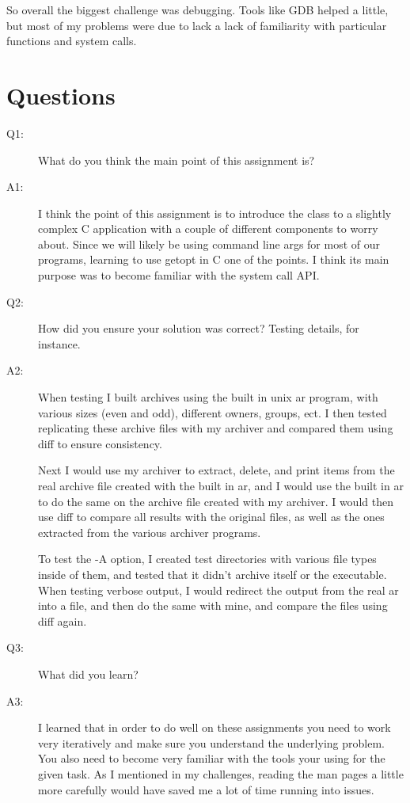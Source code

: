 \documentclass[letterpaper,10pt]{article}
\begin{document}
So overall the biggest challenge was debugging. Tools like GDB helped a little,
but most of my problems were due to lack a lack of familiarity with particular
functions and system calls.

\section{Questions}
\begin{description}
\item[Q1:] What do you think the main point of this assignment is?
\item[A1:] I think the point of this assignment is to introduce the class to a
slightly complex C application with a couple of different components to worry
about. Since we will likely be using command line args for most of our
programs, learning to use getopt in C one of the points. I think its main
purpose was to become familiar with the system call API.

\item[Q2:] How did you ensure your solution was correct? Testing details, for instance.
\item[A2:] When testing I built archives using the built in unix ar program,
with various sizes (even and odd), different owners, groups, ect. I then tested
replicating these archive files with my archiver and compared them using diff
to ensure consistency.

Next I would use my archiver to extract, delete, and print items from the real
archive file created with the built in ar, and I would use the built in ar to
do the same on the archive file created with my archiver. I would then use diff
to compare all results with the original files, as well as the ones extracted
from the various archiver programs.

To test the -A option, I created test directories with various file types
inside of them, and tested that it didn't archive itself or the executable.
When testing verbose output, I would redirect the output from the real ar into
a file, and then do the same with mine, and compare the files using diff again.

\item[Q3:] What did you learn?
\item[A3:] I learned that in order to do well on these assignments you need to
work very iteratively and make sure you understand the underlying problem. You
also need to become very familiar with the tools your using for the given task.
As I mentioned in my challenges, reading the man pages a little more carefully
would have saved me a lot of time running into issues.


\end{description}
\end{document}
